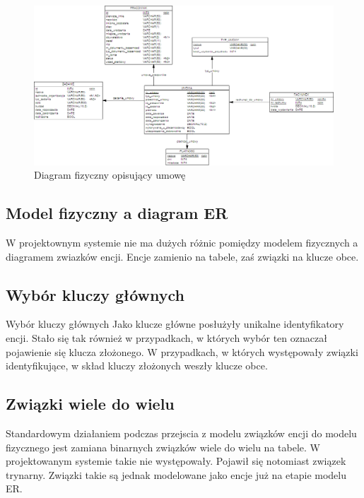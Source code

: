 \begin{figure}[tdh]
    \begin{center}
	\includegraphics[scale=.8,angle=-90]{img/fizyczny3.png}
	\caption{Diagram fizyczny opisujący umowę}
	\label{fizyczny3}
    \end{center}
\end{figure}

\subsection[Model fizyczny a diagram ER][Model fizyczny a diagram ER]{Model fizyczny a diagram ER}
W projektownym systemie nie ma dużych różnic pomiędzy modelem fizycznych a diagramem zwiazków encji.
Encje zamienio na tabele, zaś związki na klucze obce. 

\subsection[Wybór kluczy głównych]{Wybór kluczy głównych}{Wybór kluczy głównych}
Jako klucze główne posłużyły unikalne identyfikatory encji. Stało się tak również w przypadkach, w których wybór ten oznaczał pojawienie się klucza złożonego. W przypadkach, w których występowały związki identyfikujące, w skład kluczy złożonych weszły klucze obce.

\subsection[Związki wiele do wielu][Związki wiele do wielu]{Związki wiele do wielu}
Standardowym działaniem podczas przejscia z modelu związków encji do modelu fizycznego jest zamiana binarnych związków wiele do wielu na tabele. W projektowanym systemie takie nie występowały. Pojawił się notomiast związek trynarny. Związki takie są jednak modelowane jako encje już na etapie modelu ER.

